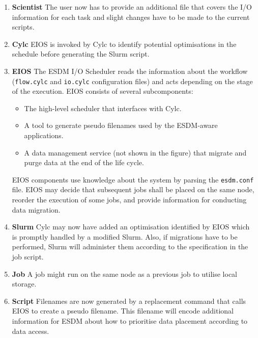 \documentclass{superfri}
\begin{document}

\begin{enumerate}

  \item \textbf{Scientist} The user now has to provide an additional file that covers the I/O information for each task and slight changes have to be made to the current scripts.

  \item \textbf{Cylc} EIOS is invoked by Cylc to identify potential optimisations in the schedule before generating the Slurm script.

  \item \textbf{EIOS} The ESDM I/O Scheduler reads the information about the workflow (\texttt{flow.cylc} and \texttt{io.cylc} configuration files) and acts depending on the stage of the execution.
  EIOS consists of several subcomponents:
    \begin{itemize}

      \item The high-level scheduler that interfaces with Cylc.

      \item A tool to generate pseudo filenames used by the ESDM-aware applications.

      \item A data management service (not shown in the figure) that migrate and purge data at the end of the life cycle.
    \end{itemize}
  EIOS components use knowledge about the system by parsing the \texttt{esdm.conf} file.
  EIOS may decide that subsequent jobs shall be placed on the same node, reorder the execution of some jobs, and provide information for conducting data migration.

  \item \textbf{Slurm}
  Cylc may now have added an optimisation identified by EIOS which is promptly handled by a modified Slurm.
  Also, if migrations have to be performed, Slurm will administer them according to the specification in the job script.

  \item \textbf{Job}
  A job might run on the same node as a previous job to utilise local storage.

  \item \textbf{Script}
  Filenames are now generated by a replacement command that calls EIOS to create a pseudo filename.
  This filename will encode additional information for ESDM about how to prioritise data placement according to data access.


\end{enumerate}
\end{document}
